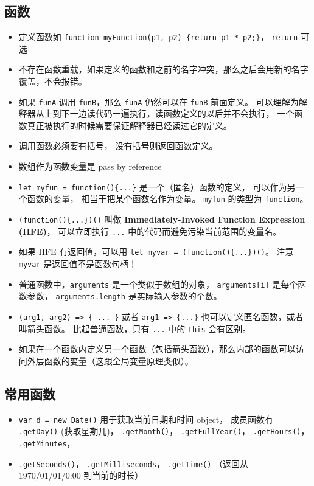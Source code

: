 \subsection{函数}
\begin{itemize}
\item 定义函数如 \verb|function myFunction(p1, p2) {return p1 * p2;}|， \verb|return| 可选
\item 不存在函数重载，如果定义的函数和之前的名字冲突，那么之后会用新的名字覆盖，不会报错。
\item 如果 \verb`funA` 调用 \verb`funB`，那么 \verb`funA` 仍然可以在 \verb`funB` 前面定义。 可以理解为解释器从上到下一边读代码一遍执行，读函数定义的以后并不会执行， 一个函数真正被执行的时候需要保证解释器已经读过它的定义。
\item 调用函数必须要有括号， 没有括号则返回函数定义。
\item 数组作为函数变量是 pass by reference
\item \verb|let myfun = function(){...}| 是一个（匿名）函数的定义， 可以作为另一个函数的变量， 相当于把某个函数名作为变量。 \verb`myfun` 的类型为 \verb|function|。
\item \verb|(function(){...})()| 叫做 \textbf{Immediately-Invoked Function Expression (IIFE)}， 可以立即执行 \verb|...| 中的代码而避免污染当前范围的变量名。
\item 如果 IIFE 有返回值，可以用 \verb`let myvar = (function(){...})()`。 注意 \verb`myvar` 是返回值不是函数句柄！
\item 普通函数中，\verb`arguments` 是一个类似于数组的对象， \verb`arguments[i]` 是每个函数参数， \verb`arguments.length` 是实际输入参数的个数。
\item \verb`(arg1, arg2) => { ... }` 或者 \verb`arg1 => {...}` 也可以定义匿名函数，或者叫箭头函数。 比起普通函数，只有 \verb`...` 中的 \verb`this` 会有区别。
\item 如果在一个函数内定义另一个函数（包括箭头函数），那么内部的函数可以访问外层函数的变量（这跟全局变量原理类似）。
\end{itemize}

\subsection{常用函数}
\begin{itemize}
\item \verb|var d = new Date()| 用于获取当前日期和时间 object， 成员函数有 \verb|.getDay()| (获取星期几)， \verb|.getMonth()|， \verb|.getFullYear()|， \verb|.getHours()|， \verb|.getMinutes|，
\item \verb|.getSeconds()|， \verb|.getMilliseconds|， \verb|.getTime()| （返回从 1970/01/01/0:00 到当前的时长）
\end{itemize}

